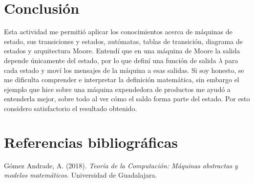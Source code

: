 \documentclass{article}
\begin{document}
\section{Conclusión}
Esta actividad me permitió aplicar los conocimientos acerca de máquinas de estado, sus transiciones y estados, autómatas, tablas de transición, diagrama de estados y arquitectura Moore. Entendí que en una máquina de Moore la salida depende únicamente del estado, por lo que definí una función de salida $\lambda$ para cada estado y moví los mensajes de la máquina a esas salidas. Si soy honesto, se me dificulta comprender e interpretar la definición matemática, sin embargo el ejemplo que hice sobre una máquina expendedora de productos me ayudó a entenderla mejor, sobre todo al ver cómo el saldo forma parte del estado. Por esto considero satisfactorio el resultado obtenido.

\section{Referencias bibliográficas}
Gómez Andrade, A. (2018). \textit{Teoría de la Computación: Máquinas abstractas y modelos matemáticos.} Universidad de Guadalajara.
\end{document}
